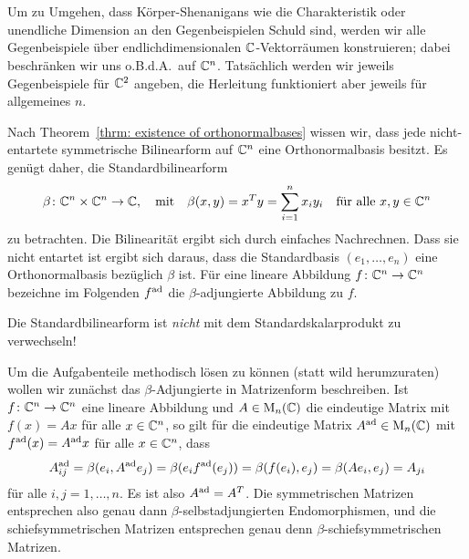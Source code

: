 \documentclass[a4paper,10pt,numbers=noenddot]{scrartcl}
\begin{document}
\section{}


Um zu Umgehen, dass Körper-Shenanigans wie die Charakteristik oder unendliche Dimension an den Gegenbeispielen Schuld sind, werden wir alle Gegenbeispiele über endlichdimensionalen $\mathbb{C}$-Vektorräumen konstruieren; dabei beschränken wir uns o.B.d.A.\ auf $\mathbb{C}^n$.
Tatsächlich werden wir jeweils Gegenbeispiele für $\mathbb{C}^2$ angeben, die Herleitung funktioniert aber jeweils für allgemeines $n$.

Nach Theorem~\ref{thrm: existence of orthonormalbases} wissen wir, dass jede nicht-entartete symmetrische Bilinearform auf $\mathbb{C}^n$ eine Orthonormalbasis besitzt.
Es genügt daher, die Standardbilinearform
\[
  \beta \colon \mathbb{C}^n \times \mathbb{C}^n \to \mathbb{C},
  \quad\text{mit}\quad
    \beta(x,y)
  = x^T y
  = \sum_{i=1}^n x_i y_i
  \quad
  \text{für alle $x, y \in \mathbb{C}^n$}
\]
zu betrachten.
Die Bilinearität ergibt sich durch einfaches Nachrechnen.
Dass sie nicht entartet ist ergibt sich daraus, dass die Standardbasis $(e_1, \dotsc, e_n)$ eine Orthonormalbasis bezüglich $\beta$ ist.
Für eine lineare Abbildung $f \colon \mathbb{C}^n \to \mathbb{C}^n$ bezeichne im Folgenden $f^{\mathrm{ad}}$ die $\beta$-adjungierte Abbildung zu $f$.


\begin{remark}
  Die Standardbilinearform ist \emph{nicht} mit dem Standardskalarprodukt zu verwechseln!
\end{remark}


Um die Aufgabenteile methodisch lösen zu können (statt wild herumzuraten) wollen wir zunächst das $\beta$-Adjungierte in Matrizenform beschreiben.
Ist $f \colon \mathbb{C}^n \to \mathbb{C}^n$ eine lineare Abbildung und $A \in \operatorname{M}_n(\mathbb{C})$ die eindeutige Matrix mit $f(x) = Ax$ für alle $x \in \mathbb{C}^n$, so gilt für die eindeutige Matrix $A^{\mathrm{ad}} \in \operatorname{M}_n(\mathbb{C})$ mit $f^{\mathrm{ad}}(x) = A^{\mathrm{ad}} x$ für alle $x \in \mathbb{C}^n$, dass
\[
    A^{\mathrm{ad}}_{ij}
  = \beta(e_i, A^{\mathrm{ad}} e_j)
  = \beta(e_i f^{\mathrm{ad}}(e_j))
  = \beta(f(e_i), e_j)
  = \beta(A e_i, e_j)
  = A_{ji}
\]
für alle $i,j = 1, \dotsc, n$.
Es ist also $A^{\mathrm{ad}} = A^T$.
Die symmetrischen Matrizen entsprechen also genau dann $\beta$-selbstadjungierten Endomorphismen, und die schiefsymmetrischen Matrizen entsprechen genau denn $\beta$-schiefsymmetrischen Matrizen.
\end{document}
